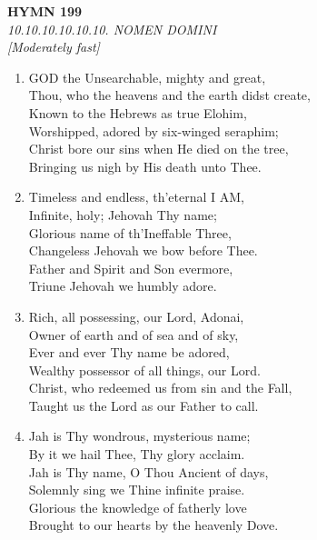 \newpage
\begin{center}
    {\Large \textbf{HYMN 199}}
    \\
    \textit{10.10.10.10.10.10. NOMEN DOMINI}
    \\
    \textit{\small [Moderately fast]}
\end{center}
\vspace{1em}

\begin{enumerate}
    \item GOD the Unsearchable, mighty and great, \\
        Thou, who the heavens and the earth didst create, \\
        Known to the Hebrews as true Elohim, \\
        Worshipped, adored by six-winged seraphim; \\
        Christ bore our sins when He died on the tree, \\
        Bringing us nigh by His death unto Thee.

    \item Timeless and endless, th'eternal I AM, \\
        Infinite, holy; Jehovah Thy name; \\
        Glorious name of th'Ineffable Three, \\
        Changeless Jehovah we bow before Thee. \\
        Father and Spirit and Son evermore, \\
        Triune Jehovah we humbly adore.

    \item Rich, all possessing, our Lord, Adonai, \\
        Owner of earth and of sea and of sky, \\
        Ever and ever Thy name be adored, \\
        Wealthy possessor of all things, our Lord. \\
        Christ, who redeemed us from sin and the Fall, \\
        Taught us the Lord as our Father to call.

    \item Jah is Thy wondrous, mysterious name; \\
        By it we hail Thee, Thy glory acclaim. \\
        Jah is Thy name, O Thou Ancient of days, \\
        Solemnly sing we Thine infinite praise. \\
        Glorious the knowledge of fatherly love \\
        Brought to our hearts by the heavenly Dove.


\end{enumerate}
